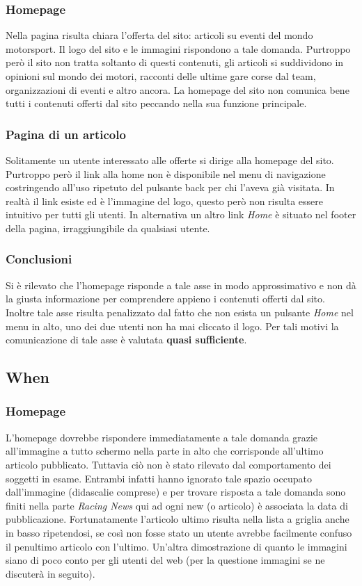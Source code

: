 		\subsubsection{Homepage}
			Nella pagina risulta chiara l'offerta del sito: articoli su eventi del mondo motorsport. Il logo del sito e le immagini rispondono a tale domanda. Purtroppo però il sito non tratta soltanto di questi contenuti, gli articoli si suddividono in opinioni sul mondo dei motori, racconti delle ultime gare corse dal team, organizzazioni di eventi e altro ancora. La homepage del sito non comunica bene tutti i contenuti offerti dal sito peccando nella sua funzione principale.
		
		\subsubsection{Pagina di un articolo}
			Solitamente un utente interessato alle offerte si dirige alla homepage del sito. Purtroppo però il link alla home non è disponibile nel menu di navigazione costringendo all'uso ripetuto del pulsante back per chi l'aveva già visitata. In realtà il link esiste ed è l'immagine del logo, questo però non risulta essere intuitivo per tutti gli utenti. In alternativa un altro link \textit{Home} è situato nel footer della pagina, irraggiungibile da qualsiasi utente.
			
		\subsubsection{Conclusioni}
			Si è rilevato che l'homepage risponde a tale asse in modo approssimativo e non dà la giusta informazione per comprendere appieno i contenuti offerti dal sito. Inoltre tale asse risulta penalizzato dal fatto che non esista un pulsante \textit{Home} nel menu in alto, uno dei due utenti non ha mai cliccato il logo. Per tali motivi la comunicazione di tale asse è valutata \textbf{quasi sufficiente}.
		
	
	\subsection{When}
	
		\subsubsection{Homepage}
			L'homepage dovrebbe rispondere immediatamente a tale domanda grazie all'immagine a tutto schermo nella parte in alto che corrisponde all'ultimo articolo pubblicato. Tuttavia ciò non è stato rilevato dal comportamento dei soggetti in esame. Entrambi infatti hanno ignorato tale spazio occupato dall'immagine (didascalie comprese) e per trovare risposta a tale domanda sono finiti nella parte \textit{Racing News} qui ad ogni new (o articolo) è associata la data di pubblicazione. Fortunatamente l'articolo ultimo risulta nella lista a griglia anche in basso ripetendosi, se così non fosse stato un utente avrebbe facilmente confuso il penultimo articolo con l'ultimo. Un'altra dimostrazione di quanto le immagini siano di poco conto per gli utenti del web (per la questione immagini se ne discuterà in seguito).
		
